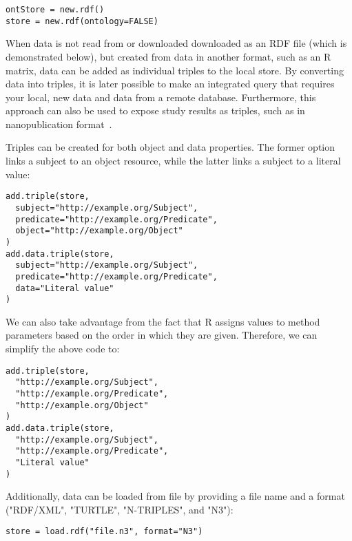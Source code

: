 \documentclass[12pt]{article}
\begin{document}
\begin{footnotesize}
\begin{verbatim}
ontStore = new.rdf()
store = new.rdf(ontology=FALSE)
\end{verbatim}
\end{footnotesize}

When data is not read from or downloaded downloaded as an RDF file (which is demonstrated below),
but created from data in another format, such as an R matrix, data can be added as individual triples
to the local store. By converting data into triples, it is later possible to make an integrated query
that requires your local, new data and data from a remote database. Furthermore, this approach can
also be used to expose study results as triples, such as in nanopublication format~\cite{Mons2011}.

Triples can be created for both object and data properties. The former option links a subject to an object
resource, while the latter links a subject to a literal value:

\begin{footnotesize}
\begin{verbatim}
add.triple(store,
  subject="http://example.org/Subject",
  predicate="http://example.org/Predicate",
  object="http://example.org/Object"
)
add.data.triple(store,
  subject="http://example.org/Subject",
  predicate="http://example.org/Predicate",
  data="Literal value"
)
\end{verbatim}
\end{footnotesize}

We can also take advantage from the fact that R assigns values to method parameters based on
the order in which they are given. Therefore, we can simplify the above code to:

\begin{footnotesize}
\begin{verbatim}
add.triple(store,
  "http://example.org/Subject",
  "http://example.org/Predicate",
  "http://example.org/Object"
)
add.data.triple(store,
  "http://example.org/Subject",
  "http://example.org/Predicate",
  "Literal value"
)
\end{verbatim}
\end{footnotesize}

Additionally, data can be loaded from file by providing a file name and a format ("RDF/XML", "TURTLE",
"N-TRIPLES", and "N3"):

\begin{footnotesize}
\begin{verbatim}
store = load.rdf("file.n3", format="N3")
\end{verbatim}
\end{footnotesize}
\end{document}
